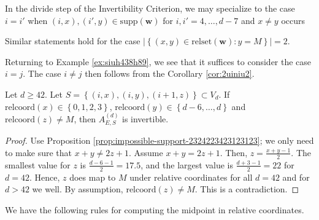 \begin{corollary}\label{cor:2uiniu2}
    In the divide step of the Invertibility Criterion, we may specialize to the case \( i = i' \) when \( (i,x), (i',y) \in \mathrm{supp}(\mathbf{w}) \) for \( i,i' = 4, \dots, d-7 \) and \( x \neq y \) occurs 
\end{corollary}

Similar statements hold for the case \( \lvert \left\{ (x,y) \in \mathrm{relset}(\mathbf{w}) : y = M \right\} \rvert = 2 \).

\begin{example}
    Returning to Example \ref{ex:siuh438h89}, we see that it suffices to consider the case \( i = j \). The case \( i \neq j \) then follows from the Corollary \ref{cor:2uiniu2}.
\end{example}

\begin{corollary}
    Let \( d \geq 42 \).
    Let \( S = \left\{ (i,x), (i,y), (i+1,z) \right\} \subset V_d \). If \( \mathrm{relcoord}(x) \in \left\{ 0,1,2,3 \right\} \), \( \mathrm{relcoord}(y) \in \left\{ d-6, \dots, d \right\} \) and \( \mathrm{relcoord}(z) \neq M  \), then \( A^{(d)}_{E, S} \) is invertible.
\end{corollary}

\begin{proof}
    Use Proposition \ref{prop:impossible-support-2324223423123123}; we only need to make sure that \( x + y \neq 2z + 1 \). Assume \( x + y = 2z + 1 \). Then, \( z = \frac{x+y -1}{2} \). The smallest value for \( z \) is \( \frac{d-6-1}{2} = 17.5 \), and the largest value is \( \frac{d+3-1}{2} = 22 \) for \( d = 42 \). Hence, \( z \) does map to \( M \) under relative coordinates for all \( d = 42 \) and for \( d > 42 \) we well. By assumption,  \( \mathrm{relcoord}(z) \neq M  \). This is a contradiction.
\end{proof}

We have the following rules for computing the midpoint in relative coordinates.

